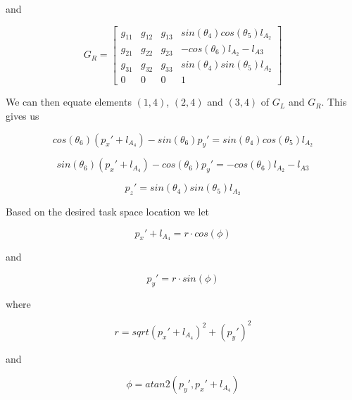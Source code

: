and

\begin{equation}
G_R = \left[ \begin{array}{cccc} 
g_{11} & g_{12} & g_{13} & sin(\theta_4)cos(\theta_5)l_{A_2} \\
g_{21} & g_{22} & g_{23} & -cos(\theta_6)l_{A_2}-l_{A3}       \\
g_{31} & g_{32} & g_{33} & sin(\theta_4)sin(\theta_5)l_{A_2}  \\
0      & 0      & 0      & 1   
\end{array} \right]
\end{equation}

We can then equate elements $(1,4)$, $(2,4)$ and $(3,4)$ of $G_L$ and $G_R$. 
This gives us

\begin{equation}\label{eq:thetaSolve11}
cos(\theta_6)(p_x'+l_{A_4})-sin(\theta_6)p_y' = sin(\theta_4)cos(\theta_5)l_{A_2}
\end{equation}

\begin{equation}\label{eq:thetaSolve12}
sin(\theta_6)(p_x'+l_{A_4})-cos(\theta_6)p_y' = -cos(\theta_6)l_{A_2}-l_{A3}
\end{equation}

\begin{equation}\label{eq:thetaSolve13}
p_z' = sin(\theta_4)sin(\theta_5)l_{A_2}
\end{equation}

Based on the desired task space location we let

\begin{equation}\label{eq:thetaSolve21}
p_x' + l_{A_4} = r \cdot cos(\phi)
\end{equation}

and

\begin{equation}\label{eq:thetaSolve22}
p_y' = r \cdot sin(\phi)
\end{equation}

where 

\begin{equation}\label{eq:thetaSolve31}
r = sqrt{(p_x'+l_{A_4})^2 + (p_y')^2}
\end{equation}

and 

\begin{equation}\label{eq:thetaSolve32}
\phi = atan2(p_y',p_x'+l_{A_4})
\end{equation}

